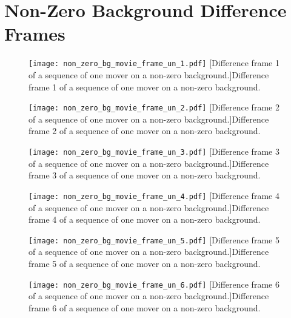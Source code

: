 \clearpage

\section{Non-Zero Background Difference Frames}

\begin{figure}[!ht]
	\centering
	\texttt{[image: non\_zero\_bg\_movie\_frame\_un\_1.pdf]}
	[Difference frame 1 of a sequence of one mover on a non-zero background.]{Difference frame 1 of a sequence of one mover on a non-zero background.}
	\label{fig:non_zero_bg_movie_frame_un_1}
\end{figure}

\begin{figure}[!ht]
	\centering
	\texttt{[image: non\_zero\_bg\_movie\_frame\_un\_2.pdf]}
	[Difference frame 2 of a sequence of one mover on a non-zero background.]{Difference frame 2 of a sequence of one mover on a non-zero background.}
	\label{fig:non_zero_bg_movie_frame_un_2}
\end{figure}

\begin{figure}[!ht]
	\centering
	\texttt{[image: non\_zero\_bg\_movie\_frame\_un\_3.pdf]}
	[Difference frame 3 of a sequence of one mover on a non-zero background.]{Difference frame 3 of a sequence of one mover on a non-zero background.}
	\label{fig:non_zero_bg_movie_frame_un_3}
\end{figure}

\clearpage

\begin{figure}[!ht]
	\centering
	\texttt{[image: non\_zero\_bg\_movie\_frame\_un\_4.pdf]}
	[Difference frame 4 of a sequence of one mover on a non-zero background.]{Difference frame 4 of a sequence of one mover on a non-zero background.}
	\label{fig:non_zero_bg_movie_frame_un_4}
\end{figure}

\begin{figure}[!ht]
	\centering
	\texttt{[image: non\_zero\_bg\_movie\_frame\_un\_5.pdf]}
	[Difference frame 5 of a sequence of one mover on a non-zero background.]{Difference frame 5 of a sequence of one mover on a non-zero background.}
	\label{fig:non_zero_bg_movie_frame_un_5}
\end{figure}

\begin{figure}[!ht]
	\centering
	\texttt{[image: non\_zero\_bg\_movie\_frame\_un\_6.pdf]}
	[Difference frame 6 of a sequence of one mover on a non-zero background.]{Difference frame 6 of a sequence of one mover on a non-zero background.}
	\label{fig:non_zero_bg_movie_frame_un_6}
\end{figure}

